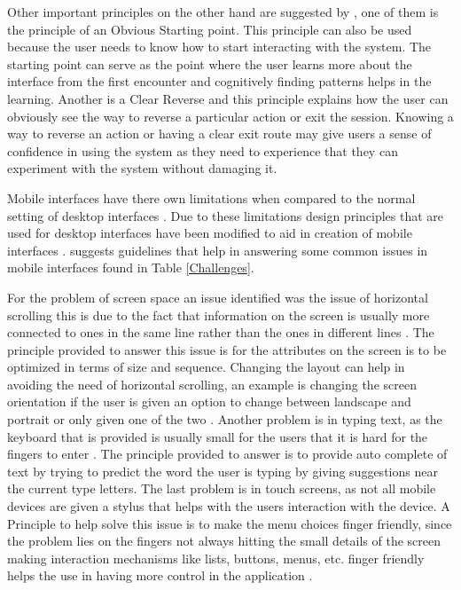 Other important principles on the other hand are suggested by , one of them is the principle of an Obvious Starting point. This principle can also be used because the user needs to know how to start interacting with the system. The starting point can serve as the point where the user learns more about the interface from the first encounter and cognitively finding patterns helps in the learning. Another is a Clear Reverse and this principle explains how the user can obviously see the way to reverse a particular action or exit the session. Knowing a way to reverse an action or having a clear exit route may give users a sense of confidence in using the system as they need to experience that they can experiment with the system without damaging it.

Mobile interfaces have there own limitations when compared to the normal setting of desktop interfaces \cite{gong2004guidelines}. Due to these limitations design principles that are used for desktop interfaces have been modified to aid in creation of mobile interfaces \cite{gong2004guidelines}.  suggests guidelines that help in answering some common issues in mobile interfaces found in Table \ref{Challenges}.

For the problem of screen space an issue identified was the issue of horizontal scrolling this is due to the fact that information on the screen is usually more connected to ones in the same line rather than the ones in different lines \cite{nilsson2009design}. The principle provided to answer this issue is for the attributes on the screen is to be optimized in terms of size and sequence. Changing the layout can help in avoiding the need of horizontal scrolling, an example is changing the screen orientation if the user is given an option to change between landscape and portrait or only given one of the two \cite{nilsson2009design}. Another problem is in typing text, as the keyboard that is provided is usually small for the users that it is hard for the fingers to enter \cite{nilsson2009design}. The principle provided to answer is to provide auto complete of text by trying to predict the word the user is typing by giving suggestions near the current type letters. The last problem is in touch screens, as not all mobile devices are given a stylus that helps with the users interaction with the device. A Principle to help solve this issue is to make the menu choices finger friendly, since the problem lies on the fingers not always hitting the small details of the screen making interaction mechanisms like lists, buttons, menus, etc. finger friendly helps the use in having more control in the application \cite{nilsson2009design}.   


